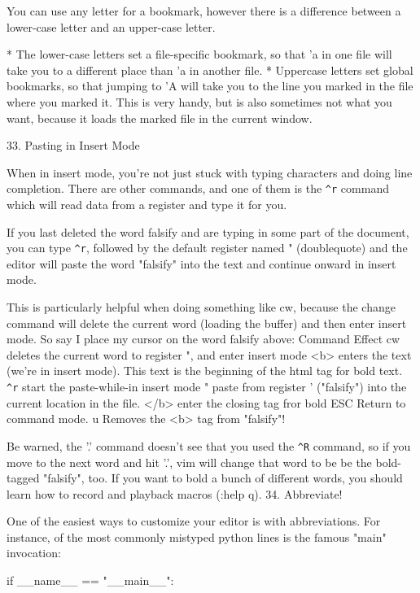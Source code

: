 \documentclass[a4paper, 12pt]{article}
\begin{document}
      You can use any letter for a bookmark, however there is a difference between a lower-case letter and an upper-case letter.

          * The lower-case letters set a file-specific bookmark, so that 'a in one file will take you to a different place than 'a in another file.
          * Uppercase letters set global bookmarks, so that jumping to 'A will take you to the line you marked in the file where you marked it. This is very handy, but is also sometimes not what you want, because it loads the marked file in the current window. 

  33. Pasting in Insert Mode

      When in insert mode, you're not just stuck with typing characters and doing line completion. There are other commands, and one of them is the \texttt{\^{}r} command which will read data from a register and type it for you.

      If you last deleted the word falsify and are typing in some part of the document, you can type \texttt{\^{}r}, followed by the default register named " (doublequote) and the editor will paste the word "falsify" into the text and continue onward in insert mode.

      This is particularly helpful when doing something like cw, because the change command will delete the current word (loading the buffer) and then enter insert mode. So say I place my cursor on the word falsify above:
      Command	Effect
      cw	deletes the current word to register ", and enter insert mode
      <b>	enters the text (we're in insert mode). This text is the beginning of the html tag for bold text.
      \texttt{\^{}r}	start the paste-while-in insert mode
      "	paste from register ' ("falsify") into the current location in the file.
      </b>	enter the closing tag fror bold
      ESC	Return to command mode.
      u	Removes the <b> tag from "falsify"!

      Be warned, the '.' command doesn't see that you used the \texttt{\^{}R} command, so if you move to the next word and hit '.', vim will change that word to be be the bold-tagged "falsify", too. If you want to bold a bunch of different words, you should learn how to record and playback macros (:help q).
  34. Abbreviate!

      One of the easiest ways to customize your editor is with abbreviations. For instance, of the most commonly mistyped python lines is the famous "main" invocation:

                  if __name__ == "__main__":
              
\end{document}
